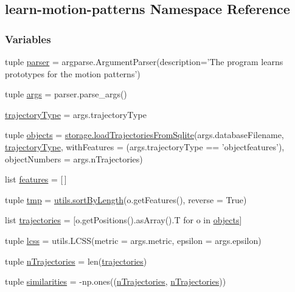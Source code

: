 \hypertarget{namespacelearn-motion-patterns}{\subsection{learn-\/motion-\/patterns Namespace Reference}
\label{namespacelearn-motion-patterns}
}
\subsubsection*{Variables}
\begin{DoxyCompactItemize}
\item 
tuple \hyperlink{namespacelearn-motion-patterns_a2ee2575827c62e37bfd79aced1148c60}{parser} = argparse.\-Argument\-Parser(description='The program learns prototypes for the motion patterns')
\item 
tuple \hyperlink{namespacelearn-motion-patterns_a6123b7367cecd161c4b37d4e5ade6160}{args} = parser.\-parse\-\_\-args()
\item 
\hyperlink{namespacelearn-motion-patterns_ace4aade9e65ee501ddec0deb5f45a58c}{trajectory\-Type} = args.\-trajectory\-Type
\item 
tuple \hyperlink{namespacelearn-motion-patterns_a242ac9b9cb6e845d06e5e03fbfd36476}{objects} = \hyperlink{namespacestorage_aaafba9f6bc0816ff0084df5e1d892a9d}{storage.\-load\-Trajectories\-From\-Sqlite}(args.\-database\-Filename, \hyperlink{namespacelearn-motion-patterns_ace4aade9e65ee501ddec0deb5f45a58c}{trajectory\-Type}, with\-Features = (args.\-trajectory\-Type == 'objectfeatures'), object\-Numbers = args.\-n\-Trajectories)
\item 
list \hyperlink{namespacelearn-motion-patterns_a1a839acfed418bb16ca2023be5596653}{features} = \mbox{[}$\,$\mbox{]}
\item 
tuple \hyperlink{namespacelearn-motion-patterns_ab1cf5c122059cea6e978c78bd1074946}{tmp} = \hyperlink{namespaceutils_a53b90e530e8f03a89dab67fd68c47952}{utils.\-sort\-By\-Length}(o.\-get\-Features(), reverse = True)
\item 
list \hyperlink{namespacelearn-motion-patterns_afdef69b14d29eacc7430f2fe94217352}{trajectories} = \mbox{[}o.\-get\-Positions().as\-Array().T for o in \hyperlink{namespacelearn-motion-patterns_a242ac9b9cb6e845d06e5e03fbfd36476}{objects}\mbox{]}
\item 
tuple \hyperlink{namespacelearn-motion-patterns_a555894845c9f5033522d85dda8b35b44}{lcss} = utils.\-L\-C\-S\-S(metric = args.\-metric, epsilon = args.\-epsilon)
\item 
tuple \hyperlink{namespacelearn-motion-patterns_a1fab655ce5b2a25a3dc5eb15a902bf6b}{n\-Trajectories} = len(\hyperlink{namespacelearn-motion-patterns_afdef69b14d29eacc7430f2fe94217352}{trajectories})
\item 
tuple \hyperlink{namespacelearn-motion-patterns_ab858728c4958e5b8bdd23a4afaed49cc}{similarities} = -\/np.\-ones((\hyperlink{namespacelearn-motion-patterns_a1fab655ce5b2a25a3dc5eb15a902bf6b}{n\-Trajectories}, \hyperlink{namespacelearn-motion-patterns_a1fab655ce5b2a25a3dc5eb15a902bf6b}{n\-Trajectories}))
\end{DoxyCompactItemize}


